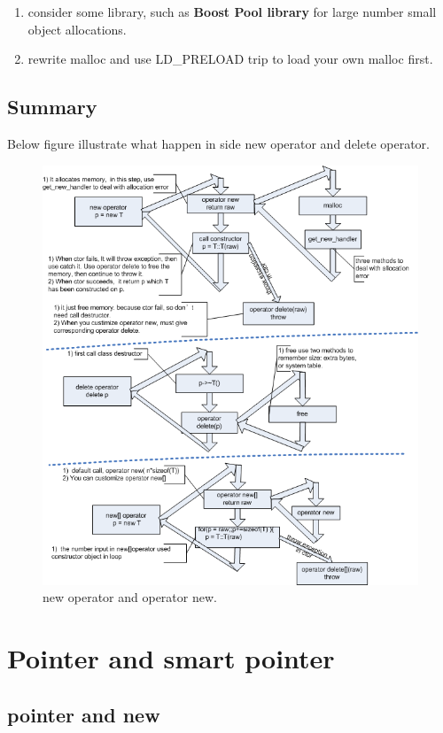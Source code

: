 \documentclass[a4paper,11pt,twoside]{book}
\begin{document}
\begin{itemize}
	\begin{enumerate}
		\item consider some library, such as \textbf{Boost Pool library} for large number small object allocations. 
		\item rewrite malloc and use LD\_PRELOAD trip to load your own malloc first.
	\end{enumerate}
	
\end{itemize}

\section{Summary}
Below figure illustrate what happen in side new operator and delete operator.
\begin{figure}[ht]
	\centering
	\includegraphics[width=0.90\linewidth]{pics/new.png}
	\caption{new operator and operator new.}
	\label{fig:smartpointer}
\end{figure}


\chapter{Pointer and smart pointer}

\section{pointer and new}
\end{document}

